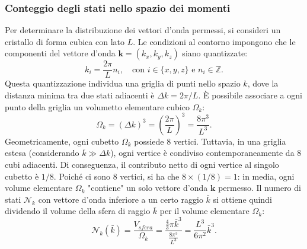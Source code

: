 \documentclass[a4paper,11pt]{report}
\begin{document}
\subsubsection{Conteggio degli stati nello spazio dei momenti}
Per determinare la distribuzione dei vettori d'onda permessi, si consideri un cristallo di forma cubica con lato $L$. Le condizioni al contorno impongono che le componenti del vettore d'onda $\bm{k} = (k_x, k_y, k_z)$ siano quantizzate:
\begin{equation}
    k_i = \frac{2\pi}{L} n_i, \quad \text{con } i \in \{x,y,z\} \text{ e } n_i \in \mathbb{Z}.
\end{equation}
Questa quantizzazione individua una griglia di punti nello spazio $k$, dove la distanza minima tra due stati adiacenti è $\Delta k = 2\pi/L$. È possibile associare a ogni punto della griglia un volumetto elementare cubico $\Omega_k$:
\begin{equation}
    \Omega_k = (\Delta k)^3 = \left( \frac{2\pi}{L} \right)^3 = \frac{8\pi^3}{L^3}.
\end{equation}
Geometricamente, ogni cubetto $\Omega_k$ possiede 8 vertici. Tuttavia, in una griglia estesa (considerando $\bar{k} \gg \Delta k$), ogni vertice è condiviso contemporaneamente da 8 cubi adiacenti. Di conseguenza, il contributo netto di ogni vertice al singolo cubetto è $1/8$. Poiché ci sono 8 vertici, si ha che $8 \times (1/8) = 1$: in media, ogni volume elementare $\Omega_k$ "contiene" un solo vettore d'onda $\bm{k}$ permesso.
Il numero di stati $\mathcal{N}_{k}$ con vettore d'onda inferiore a un certo raggio $\bar{k}$ si ottiene quindi dividendo il volume della sfera di raggio $\bar{k}$ per il volume elementare $\Omega_k$:
\begin{equation}
    \mathcal{N}_{k}(\bar{k}) = \frac{V_{sfera}}{\Omega_k} = \frac{\frac{4}{3}\pi \bar{k}^3}{\frac{8\pi^3}{L^3}} = \frac{L^3}{6\pi^2} \bar{k}^3.
\end{equation}
\end{document}

